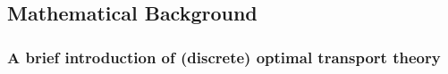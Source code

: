 \documentclass{article}
\numberwithin{equation}{section}
\theoremstyle{definition}
\begin{document}









\subsection{Mathematical Background} \label{IntroOfOT}



\subsubsection*{A brief introduction of (discrete) optimal transport theory} 
\end{document}
